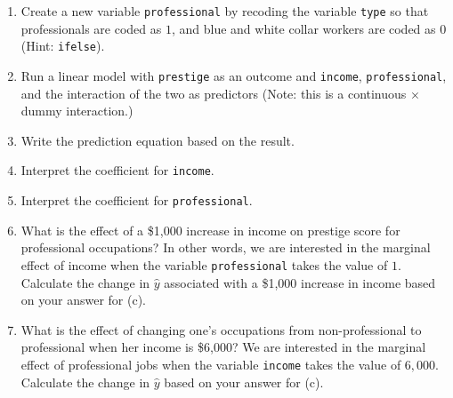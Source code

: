 \documentclass[12pt,letterpaper]{article}
\begin{document}
\newpage
\begin{enumerate}
	
	\item [(a)]
	Create a new variable \texttt{professional} by recoding the variable \texttt{type} so that professionals are coded as $1$, and blue and white collar workers are coded as $0$ (Hint: \texttt{ifelse}).
			  
	
	\vspace{6cm}
	
	
	\item [(b)]
	Run a linear model with \texttt{prestige} as an outcome and \texttt{income}, \texttt{professional}, and the interaction of the two as predictors (Note: this is a continuous $\times$ dummy interaction.)
	
	\vspace{6cm}
	\item [(c)]
	Write the prediction equation based on the result.
	
\newpage
	\item [(d)]
	Interpret the coefficient for \texttt{income}.
	
	\vspace{10cm}	
	\item [(e)]
	Interpret the coefficient for \texttt{professional}.
	
	\newpage
	\item [(f)]
	What is the effect of a \$1,000 increase in income on prestige score for professional occupations? In other words, we are interested in the marginal effect of income when the variable \texttt{professional} takes the value of $1$. Calculate the change in $\hat{y}$ associated with a \$1,000 increase in income based on your answer for (c).
	
	\vspace{10cm}
	
	
	\item [(g)]
	What is the effect of changing one's occupations from non-professional to professional when her income is \$6,000? We are interested in the marginal effect of professional jobs when the variable \texttt{income} takes the value of $6,000$. Calculate the change in $\hat{y}$ based on your answer for (c).
	
	
\end{enumerate}

\newpage
\end{document}
